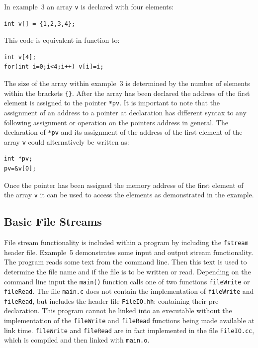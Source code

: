 \documentclass[11pt,a4paper]{scrartcl}
\def\main{\texttt{main()}$\;$}
\begin{document}
In example~3 an array \texttt{v} is declared with four elements:
\begin{verbatim}int v[] = {1,2,3,4};\end{verbatim}
This code is equivalent in function to:
\begin{verbatim}
int v[4];
for(int i=0;i<4;i++) v[i]=i;
\end{verbatim}
The size of the array within example~3 is determined by the number of
elements within the brackets \texttt{\{\}}.  After the array has been
declared the address of the first element is assigned to the pointer
\texttt{*pv}.  It is important to note that the assignment of an
address to a pointer at declaration has different syntax to any
following assignment or operation on the pointers address in general.
The declaration of \texttt{*pv} and its assignment of the address of
the first element of the array \texttt{v} could alternatively be
written as:
\begin{verbatim}
int *pv;
pv=&v[0];
\end{verbatim}
Once the pointer has been assigned the memory address of the first
element of the array \texttt{v} it can be used to access the
elements as demonstrated in the example.


\subsection{Basic File Streams}

File stream functionality is included within a program by including
the \texttt{fstream} header file.  Example~5 demonstrates some input
and output stream functionality.  The program reads some text from the
command line.  Then this text is used to determine the file name and
if the file is to be written or read.  Depending on the command line
input the \main function calls one of two functions \texttt{fileWrite}
or \texttt{fileRead}.  The file \texttt{main.c} does not contain the
implementation of \texttt{fileWrite} and \texttt{fileRead}, but
includes the header file \texttt{FileIO.hh}: containing their
pre-declaration.  This program cannot be linked into an executable
without the implementation of the \texttt{fileWrite}
and \texttt{fileRead} functions being made available at link time.
\texttt{fileWrite} and \texttt{fileRead} are in fact implemented in
the file \texttt{FileIO.cc}, which is compiled and then linked with
\texttt{main.o}.
\end{document}

